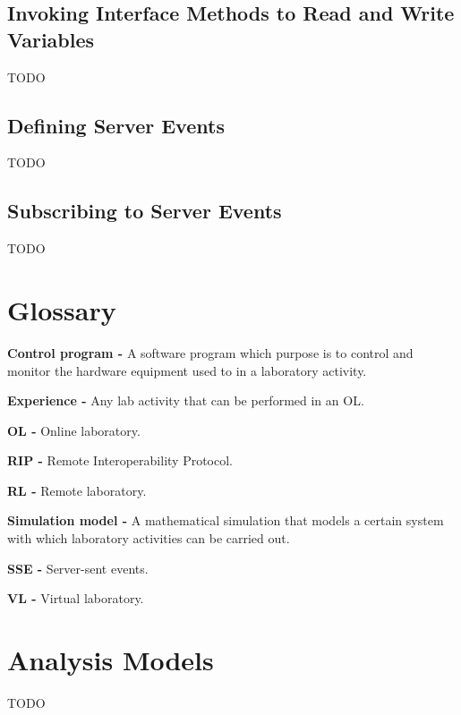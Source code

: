 \section{Invoking Interface Methods to Read and Write Variables}
TODO

\section{Defining Server Events}
TODO

\section{Subscribing to Server Events}
TODO


\begin{appendices}

\chapter{Glossary}
\textbf{Control program -} A software program which purpose is to control and monitor the hardware equipment used to in a laboratory activity.

\textbf{Experience -} Any lab activity that can be performed in an OL.

\textbf{OL -} Online laboratory.

\textbf{RIP -} Remote Interoperability Protocol.

\textbf{RL -} Remote laboratory.

\textbf{Simulation model -} A mathematical simulation that models a certain system with which laboratory activities can be carried out.

\textbf{SSE -} Server-sent events.

\textbf{VL -} Virtual laboratory.


\chapter{Analysis Models}
TODO

\end{appendices}


\renewcommand\bibname{References}

